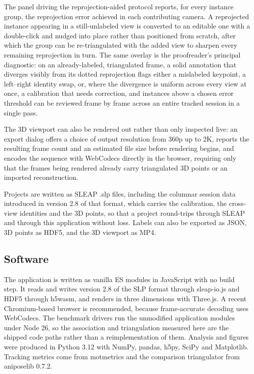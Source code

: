 \documentclass[pdflatex, sn-nature]{sn-jnl}
\theoremstyle{thmstyleone}%
\theoremstyle{thmstyletwo}%
\theoremstyle{thmstylethree}%
\begin{document}
The panel driving the reprojection-aided protocol reports, for every instance group, the reprojection error achieved in each contributing camera. A reprojected instance appearing in a still-unlabeled view is converted to an editable one with a double-click and nudged into place rather than positioned from scratch, after which the group can be re-triangulated with the added view to sharpen every remaining reprojection in turn. The same overlay is the proofreader's principal diagnostic: on an already-labeled, triangulated frame, a solid annotation that diverges visibly from its dotted reprojection flags either a mislabeled keypoint, a left–right identity swap, or, where the divergence is uniform across every view at once, a calibration that needs correction, and instances above a chosen error threshold can be reviewed frame by frame across an entire tracked session in a single pass.

The 3D viewport can also be rendered out rather than only inspected live: an export dialog offers a choice of output resolution from 360p up to 2K, reports the resulting frame count and an estimated file size before rendering begins, and encodes the sequence with WebCodecs directly in the browser, requiring only that the frames being rendered already carry triangulated 3D points or an imported reconstruction.

Projects are written as SLEAP .slp files, including the columnar session data introduced in version 2.8 of that format, which carries the calibration, the cross-view identities and the 3D points, so that a project round-trips through SLEAP and through this application without loss. Labels can also be exported as JSON, 3D points as HDF5, and the 3D viewport as MP4.

\subsection{Software}\label{methods-software}

The application is written as vanilla ES modules in JavaScript with no build step. It reads and writes version 2.8 of the SLP format through sleap-io.js and HDF5 through h5wasm, and renders in three dimensions with Three.js. A recent Chromium-based browser is recommended, because frame-accurate decoding uses WebCodecs. The benchmark drivers run the unmodified application modules under Node 26, so the association and triangulation measured here are the shipped code paths rather than a reimplementation of them. Analysis and figures were produced in Python 3.12 with NumPy, pandas, h5py, SciPy and Matplotlib. Tracking metrics come from motmetrics and the comparison triangulator from aniposelib 0.7.2.
\end{document}
